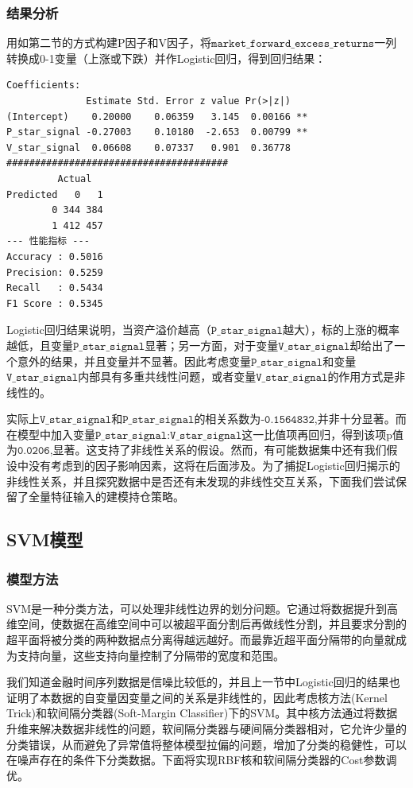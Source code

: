 \documentclass[11pt, a4paper]{article}
\begin{document}
\subsubsection{结果分析}

用如第二节的方式构建P因子和V因子，将$\texttt{market\_forward\_excess\_returns}$一列转换成0-1变量（上涨或下跌）并作Logistic回归，得到回归结果：
\begin{verbatim}
Coefficients:
              Estimate Std. Error z value Pr(>|z|)
(Intercept)    0.20000    0.06359   3.145  0.00166 **
P_star_signal -0.27003    0.10180  -2.653  0.00799 **
V_star_signal  0.06608    0.07337   0.901  0.36778
#######################################
         Actual
Predicted   0   1
        0 344 384
        1 412 457
--- 性能指标 ---
Accuracy : 0.5016
Precision: 0.5259
Recall   : 0.5434
F1 Score : 0.5345
\end{verbatim}
Logistic回归结果说明，当资产溢价越高（$\texttt{P\_star\_signal}$越大），标的上涨的概率越低，且变量$\texttt{P\_star\_signal}$显著；另一方面，对于变量$\texttt{V\_star\_signal}$却给出了一个意外的结果，并且变量并不显著。因此考虑变量$\texttt{P\_star\_signal}$和变量$\texttt{V\_star\_signal}$内部具有多重共线性问题，或者变量$\texttt{V\_star\_signal}$的作用方式是非线性的。

实际上$\texttt{V\_star\_signal}$和$\texttt{P\_star\_signal}$的相关系数为$\texttt{-0.1564832}$,并非十分显著。而在模型中加入变量$\texttt{P\_star\_signal:V\_star\_signal}$这一比值项再回归，得到该项p值为$\texttt{0.0206}$,显著。这支持了非线性关系的假设。然而，有可能数据集中还有我们假设中没有考虑到的因子影响因素，这将在后面涉及。为了捕捉Logistic回归揭示的非线性关系，并且探究数据中是否还有未发现的非线性交互关系，下面我们尝试保留了全量特征输入的建模持仓策略。
\subsection{SVM模型\cite{hastie2009elements}\cite{周志华2016机器学习}}
\subsubsection{模型方法}

SVM是一种分类方法，可以处理非线性边界的划分问题。它通过将数据提升到高维空间，使数据在高维空间中可以被超平面分割后再做线性分割，并且要求分割的超平面将被分类的两种数据点分离得越远越好。而最靠近超平面分隔带的向量就成为支持向量，这些支持向量控制了分隔带的宽度和范围。

我们知道金融时间序列数据是信噪比较低的，并且上一节中Logistic回归的结果也证明了本数据的自变量因变量之间的关系是非线性的，因此考虑核方法(Kernel Trick)和软间隔分类器(Soft-Margin Classifier)下的SVM。其中核方法通过将数据升维来解决数据非线性的问题，软间隔分类器与硬间隔分类器相对，它允许少量的分类错误，从而避免了异常值将整体模型拉偏的问题，增加了分类的稳健性，可以在噪声存在的条件下分类数据。下面将实现RBF核和软间隔分类器的Cost参数调优。
\end{document}
